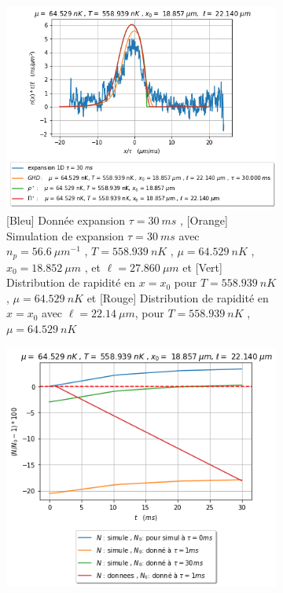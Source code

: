 \documentclass[a3, 10pt,twoside]{article}          %
\theoremstyle{plain}
\theoremstyle{definition}
\theoremstyle{remark}
\theoremstyle{definition} %
\def\OliveGreen{OliveGreen}
\begin{document}
\begin{figure}[H]
     		\begin{subfigure}[b]{0.45\textwidth}
        		\centering
        		\includegraphics[width=\textwidth]{Figures/simul_expansion_30_24-04-2024-1.2.png}
        		\caption{{\color{blue}[Bleu] Donnée  expansion $\tau = 30~ms$} , {\color{orange}[Orange] Simulation de  expansion $\tau = 30~ms$ avec $n_p = 56.6 ~{\mu m}^{-1}$ , $T = 558.939 ~nK$ , $\mu=64.529 ~nK$ , $x_0 = 18.852 ~\mu m $ , et $\ell = 27.860 ~ \mu m $} et {\color{\OliveGreen}[Vert] Distribution de rapidité en $x = x_0$ pour  $T = 558.939 ~nK$ , $\mu=64.529 ~nK$} et {\color{red}[Rouge] Distribution de rapidité en $x = x_0$ avec $\ell = 22.14 ~ \mu m $,  pour  $T = 558.939 ~nK$ , $\mu=64.529 ~nK$} }
        		\label{fig1.2:expansion30}
    		\end{subfigure}
    		\hfill
    		\begin{subfigure}[b]{0.45\textwidth}
        		\centering
        		\includegraphics[width=\textwidth]{Figures/Nat-1.2.png}

\end{subfigure}
\end{figure}
\end{document}
